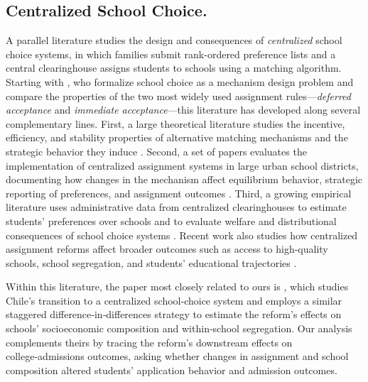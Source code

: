 \subsection{Centralized School Choice.}
A parallel literature studies the design and consequences of \emph{centralized} school choice systems, in which families submit rank-ordered preference lists and a central clearinghouse assigns students to schools using a matching algorithm. Starting with \citet{abdulkadiroglu2003}, who formalize school choice as a mechanism design problem and compare the properties of the two most widely used assignment rules—\emph{deferred acceptance} and \emph{immediate acceptance}—this literature has developed along several complementary lines. 
First, a large theoretical literature studies the incentive, efficiency, and stability properties of alternative matching mechanisms and the strategic behavior they induce \citep{abdulkadiroglu2003,kesten2010,pathak2017}. Second, a set of papers evaluates the implementation of centralized assignment systems in large urban school districts, documenting how changes in the mechanism affect equilibrium behavior, strategic reporting of preferences, and assignment outcomes \citep{abdulkadiroglu2005,abdulkadiroglu2009}. Third, a growing empirical literature uses administrative data from centralized clearinghouses to estimate students’ preferences over schools and to evaluate welfare and distributional consequences of school choice systems \citep{hastings2008,agarwal2018}. Recent work also studies how centralized assignment reforms affect broader outcomes such as access to high-quality schools, school segregation, and students’ educational trajectories \citep{neilson2021, gazmuri2024}. 

Within this literature, the paper most closely related to ours is \cite{urzua2023}, which studies Chile’s transition to a centralized school‑choice system and employs a similar staggered difference‑in‑differences strategy to estimate the reform's effects on schools' socioeconomic composition and within‑school segregation. Our analysis complements theirs by tracing the reform's downstream effects on college‑admissions outcomes, asking whether changes in assignment and school composition altered students' application behavior and admission outcomes.


